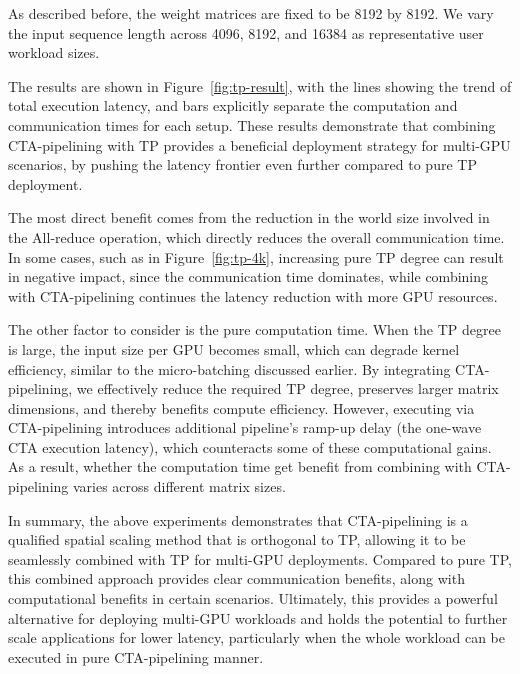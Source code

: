 As described before, the weight matrices are fixed to be 8192 by 8192. We vary the input sequence length across 4096, 8192, and 16384 as representative user workload sizes. 

The results are shown in Figure~\ref{fig:tp-result}, with the lines showing the trend of total execution latency, and bars explicitly separate the computation and communication times for each setup. These results demonstrate that combining CTA-pipelining with TP provides a beneficial deployment strategy for multi-GPU scenarios, by pushing the latency frontier even further compared to pure TP deployment. 

The most direct benefit comes from the reduction in the world size involved in the All-reduce operation, which directly reduces the overall communication time. In some cases, such as in Figure~\ref{fig:tp-4k}, increasing pure TP degree can result in negative impact, since the communication time dominates, while combining with CTA-pipelining continues the latency reduction with more GPU resources. 

The other factor to consider is the pure computation time. When the TP degree is large, the input size per GPU becomes small, which can degrade kernel efficiency, similar to the micro-batching discussed earlier. By integrating CTA-pipelining, we effectively reduce the required TP degree, preserves larger matrix dimensions, and thereby benefits compute efficiency. However, executing via CTA-pipelining introduces additional pipeline's ramp-up delay (the one-wave CTA execution latency), which counteracts some of these computational gains. As a result, whether the computation time get benefit from combining with CTA-pipelining varies across different matrix sizes. 

In summary, the above experiments demonstrates that CTA-pipelining is a qualified spatial scaling method that is orthogonal to TP, allowing it to be seamlessly combined with TP for multi-GPU deployments. Compared to pure TP, this combined approach provides clear communication benefits, along with computational benefits in certain scenarios. Ultimately, this provides a powerful alternative for deploying multi-GPU workloads and holds the potential to further scale applications for lower latency, particularly when the whole workload can be executed in pure CTA-pipelining manner.
